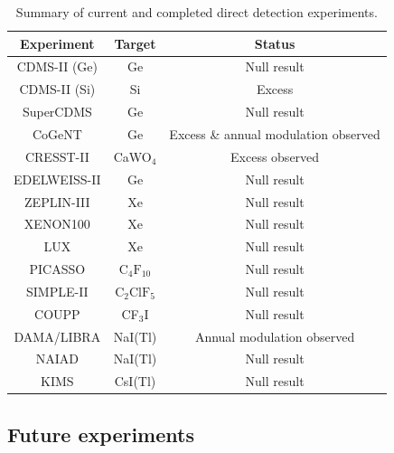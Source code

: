 

\begin{table}
	\begin{tabular}{ccc}
		\hline\hline
		Experiment & Target & Status \\
		\hline
		CDMS-II (Ge) \cite{Ahmed:2009,Ahmed:2011} & Ge & Null result \\
                CDMS-II (Si) \cite{Agnese:2013} & Si & Excess \\
                SuperCDMS \cite{Agnese:2014} & Ge & Null result \\
		CoGeNT \cite{Aalseth:2011a,Aalseth:2011b, Aalseth:2013,Aalseth:2014a,Aalseth:2014b} & Ge & Excess \& annual modulation observed \\
		CRESST-II \cite{Angloher:2012} & CaWO\(_4\) & Excess observed\\
		EDELWEISS-II \cite{Armengaud:2011} &  Ge & Null result \\
		ZEPLIN-III \cite{Akimov:2012} & Xe & Null result\\
		XENON100 \cite{Aprile:2011, Aprile:2012b} & Xe & Null result \\
                LUX \cite{Akerib:2014} & Xe & Null result \\
		PICASSO \cite{Archambault:2012} & \(\textrm{C}_4\textrm{F}_{10}\) & Null result \\
		SIMPLE-II \cite{Felizardo:2012} & \(\textrm{C}_2 \textrm{ClF}_5\) & Null result \\
		COUPP \cite{Behnke:2011} & CF\(_3\)I & Null result \\
		DAMA/LIBRA \cite{Bernabei:2008a,Bernabei:2010,Bernabei:2013} &  NaI(Tl) & Annual modulation observed \\
                NAIAD \cite{Ahmed:2003} & NaI(Tl) & Null result \\
		KIMS \cite{Lee:2007} & CsI(Tl) & Null result \\
		\hline\hline
		\end{tabular}
	\caption{Summary of current and completed direct detection experiments.}
	\label{DD:tab:ExptSummary}
\end{table}




\subsection{Future experiments}

